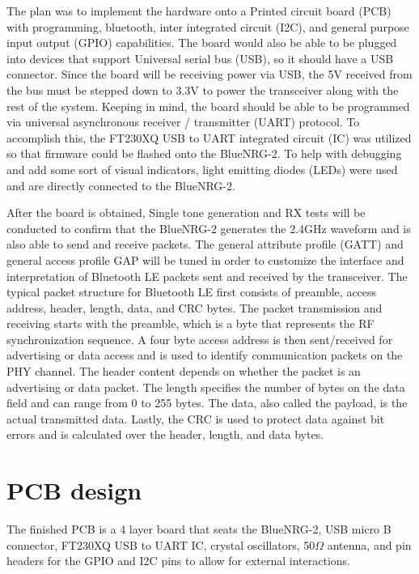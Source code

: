 \documentclass[12pt,journal,onecolumn,draftclsnofoot]{IEEEtran}
\begin{document}
The plan was to implement the hardware onto a Printed circuit board (PCB) with programming, bluetooth, inter integrated circuit (I2C), and general purpose input output (GPIO) capabilities. The board would also be able to be plugged into devices that support Universal serial bus (USB), so it should have a USB connector. Since the board will be receiving power via USB, the 5V received from the bus must be stepped down to 3.3V to power the transceiver along with the rest of the system. Keeping \cite{an2867} in mind, the board should be able to be programmed via universal asynchronous receiver / transmitter (UART) protocol. To accomplish this, the FT230XQ USB to UART integrated circuit (IC) was utilized so that firmware could be flashed onto the BlueNRG-2. To help with debugging and add some sort of visual indicators, light emitting diodes (LEDs) were used and are directly connected to the BlueNRG-2. \par

After the board is obtained, Single tone generation and RX tests will be conducted to confirm that the BlueNRG-2 generates the 2.4GHz waveform and is also able to send and receive packets. The general attribute profile (GATT) and general access profile GAP will be tuned in order to customize the interface and interpretation of Bluetooth LE packets sent and received by the transceiver. The typical packet structure for Bluetooth LE first consists of preamble, access address, header, length, data, and CRC bytes. The packet transmission and receiving starts with the preamble, which is a byte that represents the RF synchronization sequence. A four byte access address is then sent/received for advertising or data access and is used to identify communication packets on the PHY channel. The header content depends on whether the packet is an advertising or data packet. The length specifies the number of bytes on the data field and can range from 0 to 255 bytes. The data, also called the payload, is the actual transmitted data. Lastly, the CRC is used to protect data against bit errors and is calculated over the header, length, and data bytes.
\section{PCB design}

The finished PCB is a 4 layer board that seats the BlueNRG-2, USB micro B connector, FT230XQ USB to UART IC, crystal oscillators, 50$\Omega$ antenna, and pin headers for the GPIO and I2C pins to allow for external interactions. 
\end{document}
